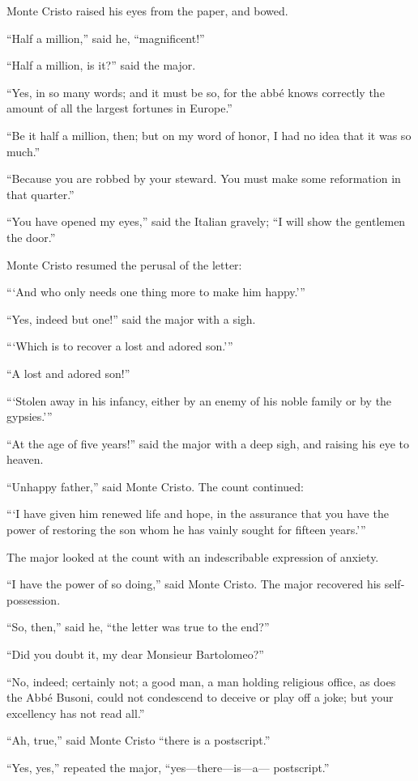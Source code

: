 Monte Cristo raised his eyes from the paper, and bowed.

“Half a million,” said he, “magnificent!”

“Half a million, is it?” said the major.

“Yes, in so many words; and it must be so, for the abbé knows correctly
the amount of all the largest fortunes in Europe.”

“Be it half a million, then; but on my word of honor, I had no idea
that it was so much.”

“Because you are robbed by your steward. You must make some reformation
in that quarter.”

“You have opened my eyes,” said the Italian gravely; “I will show the
gentlemen the door.”

Monte Cristo resumed the perusal of the letter:

“‘And who only needs one thing more to make him happy.’”

“Yes, indeed but one!” said the major with a sigh.

“‘Which is to recover a lost and adored son.’”

“A lost and adored son!”

“‘Stolen away in his infancy, either by an enemy of his noble family or
by the gypsies.’”

“At the age of five years!” said the major with a deep sigh, and
raising his eye to heaven.

“Unhappy father,” said Monte Cristo. The count continued:

“‘I have given him renewed life and hope, in the assurance that you
have the power of restoring the son whom he has vainly sought for
fifteen years.’”

The major looked at the count with an indescribable expression of
anxiety.

“I have the power of so doing,” said Monte Cristo. The major recovered
his self-possession.

“So, then,” said he, “the letter was true to the end?”

“Did you doubt it, my dear Monsieur Bartolomeo?”

“No, indeed; certainly not; a good man, a man holding religious office,
as does the Abbé Busoni, could not condescend to deceive or play off a
joke; but your excellency has not read all.”

“Ah, true,” said Monte Cristo “there is a postscript.”

“Yes, yes,” repeated the major, “yes—there—is—a— postscript.”

